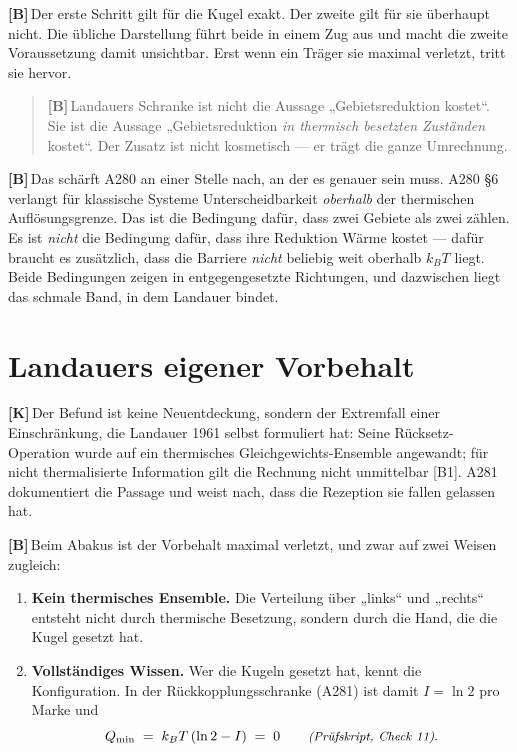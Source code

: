 \documentclass[11pt,a4paper]{article}
\newcommand{\LK}{\textcolor{layK}{\textbf{\footnotesize\textsf{[K]}}}\,}
\newcommand{\LB}{\textcolor{layB}{\textbf{\footnotesize\textsf{[B]}}}\,}
\newcommand{\pruef}[1]{{\small\itshape(Prüfskript, #1)}}
\begin{document}
\LB Der erste Schritt gilt für die Kugel exakt. Der zweite gilt für sie
überhaupt nicht. Die übliche Darstellung führt beide in einem Zug aus und macht
die zweite Voraussetzung damit unsichtbar. Erst wenn ein Träger sie maximal
verletzt, tritt sie hervor.

\begin{quote}
\LB Landauers Schranke ist nicht die Aussage „Gebietsreduktion kostet“. Sie ist
die Aussage „Gebietsreduktion \emph{in thermisch besetzten Zuständen} kostet“.
Der Zusatz ist nicht kosmetisch --- er trägt die ganze Umrechnung.
\end{quote}

\LB Das schärft A280 an einer Stelle nach, an der es genauer sein muss. A280
§6 verlangt für klassische Systeme Unterscheidbarkeit \emph{oberhalb} der
thermischen Auflösungsgrenze. Das ist die Bedingung dafür, dass zwei Gebiete als
zwei zählen. Es ist \emph{nicht} die Bedingung dafür, dass ihre Reduktion Wärme
kostet --- dafür braucht es zusätzlich, dass die Barriere \emph{nicht} beliebig
weit oberhalb $k_BT$ liegt. Beide Bedingungen zeigen in entgegengesetzte
Richtungen, und dazwischen liegt das schmale Band, in dem Landauer bindet.

\section{Landauers eigener Vorbehalt}

\LK Der Befund ist keine Neuentdeckung, sondern der Extremfall einer
Einschränkung, die Landauer 1961 selbst formuliert hat: Seine Rücksetz-Operation
wurde auf ein thermisches Gleichgewichts-Ensemble angewandt; für nicht
thermalisierte Information gilt die Rechnung nicht unmittelbar [B1]. A281
dokumentiert die Passage und weist nach, dass die Rezeption sie fallen gelassen
hat.

\LB Beim Abakus ist der Vorbehalt maximal verletzt, und zwar auf zwei Weisen
zugleich:

\begin{enumerate}[leftmargin=1.6em,itemsep=0.3em]
  \item \textbf{Kein thermisches Ensemble.} Die Verteilung über „links“ und
        „rechts“ entsteht nicht durch thermische Besetzung, sondern durch die
        Hand, die die Kugel gesetzt hat.
  \item \textbf{Vollständiges Wissen.} Wer die Kugeln gesetzt hat, kennt die
        Konfiguration. In der Rückkopplungsschranke (A281) ist damit
        $I = \ln 2$ pro Marke und
        \begin{equation}
          Q_{\min} \;=\; k_B T\,(\ln 2 - I) \;=\; 0
          \qquad \text{\pruef{Check 11}} .
        \end{equation}
\end{enumerate}
\end{document}
